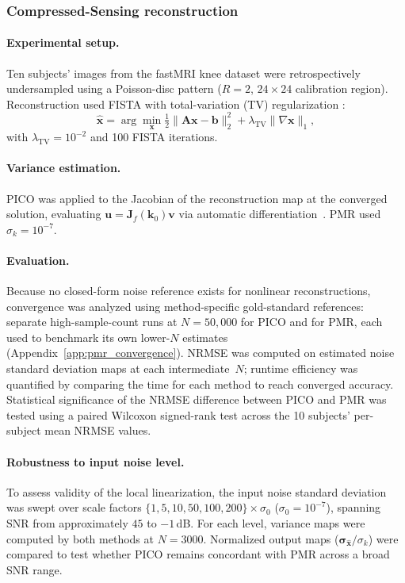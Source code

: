 \documentclass[AMA,STIX2COL,Linenumberson]{MRM}
\begin{document}
\subsubsection{Compressed-Sensing reconstruction}

\paragraph{Experimental setup.}
Ten subjects' images from the fastMRI knee dataset were retrospectively undersampled using a Poisson-disc pattern ($R=2$, $24 \times 24$ calibration region). Reconstruction used FISTA \cite{Beck2009} with total-variation (TV) regularization \cite{knoll_tv}:
\[
\hat{\mathbf{x}} = \arg\min_{\mathbf{x}} \tfrac{1}{2}\|\mathbf{A} \mathbf{x} - \mathbf{b}\|_2^2 + \lambda_{\mathrm{TV}} \|\nabla \mathbf{x}\|_{1},
\]
with $\lambda_{\mathrm{TV}} = 10^{-2}$ and 100 FISTA iterations.

\paragraph{Variance estimation.}
PICO was applied to the Jacobian of the reconstruction map at the converged solution, evaluating $\mathbf{u} = \mathbf{J}_f(\mathbf{k}_0)\mathbf{v}$ via automatic differentiation~\cite{dalmaz2025efficient}. PMR used $\sigma_k = 10^{-7}$.

\paragraph{Evaluation.}
Because no closed-form noise reference exists for nonlinear reconstructions, convergence was analyzed using method-specific gold-standard references: separate high-sample-count runs at $N = 50{,}000$ for PICO and for PMR, each used to benchmark its own lower-$N$ estimates (Appendix~\ref{app:pmr_convergence}). NRMSE was computed on estimated noise standard deviation maps at each intermediate~$N$; runtime efficiency was quantified by comparing the time for each method to reach converged accuracy. Statistical significance of the NRMSE difference between PICO and PMR was tested using a paired Wilcoxon signed-rank test across the 10 subjects' per-subject mean NRMSE values.

\paragraph{Robustness to input noise level.}
To assess validity of the local linearization, the input noise standard deviation was swept over scale factors $\{1, 5, 10, 50, 100, 200\} \times \sigma_0$ ($\sigma_0 = 10^{-7}$), spanning SNR from approximately $45$ to $-1$\,dB. For each level, variance maps were computed by both methods at $N = 3000$. Normalized output maps ($\boldsymbol{\sigma}_{\hat{\mathbf{x}}}/\sigma_k$) were compared to test whether PICO remains concordant with PMR across a broad SNR range.
\end{document}
